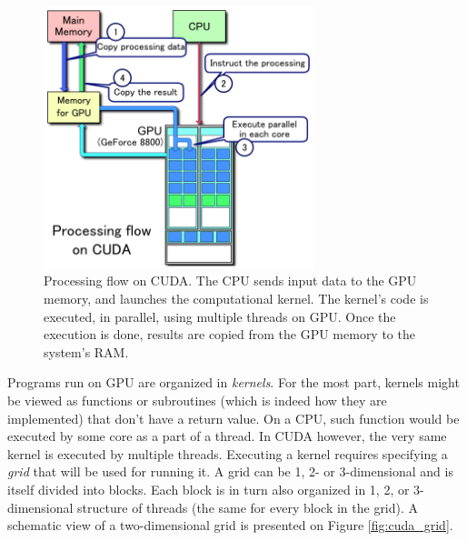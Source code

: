 \begin{figure}[ht]
    \centering
    \includegraphics[width=0.7\textwidth]{figures/CUDA_processing_flow_(En).png}
    \caption{{\protect{}} Processing flow on CUDA. The CPU sends input data to the GPU memory, and launches the computational kernel. The kernel's code is executed, in parallel, using multiple threads on GPU. Once the execution is done, results are copied from the GPU memory to the system's RAM.}
    \label{fig:cuda_flow}
\end{figure}

Programs run on GPU are organized in \emph{kernels}. For the most part, kernels might be viewed as functions or subroutines (which is indeed how they are implemented) that don't have a return value. On a CPU, such function would be executed by some core as a part of a thread. In CUDA however, the very same kernel is executed by multiple threads. Executing a kernel requires specifying a \emph{grid} that will be used for running it. A grid can be 1, 2- or 3-dimensional and is itself divided into blocks. Each block is in turn also organized in 1, 2, or 3-dimensional structure of threads (the same for every block in the grid). A schematic view of a two-dimensional grid is presented on Figure \ref{fig:cuda_grid}.

